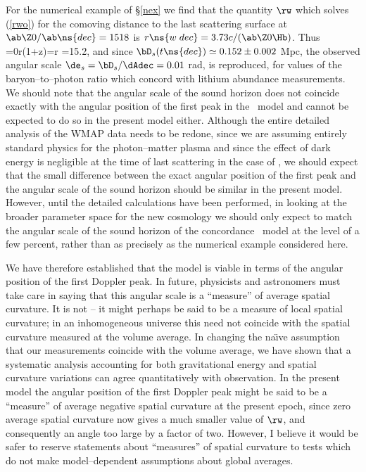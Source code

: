 \documentclass[12pt]{iopart}
\begin{document}
For the numerical example
of \S\ref{nex} we find that the quantity $\rw$ which solves (\ref{rwo})
for the comoving distance to the
last scattering surface at $\ab\Z0/\ab\ns{dec}=1518$ is $r\ns{w\;dec}=3.73
c/(\ab\Z0\Hb)$.
Thus
\beq
\dAdec={\ab\Z0r\over\gc(1+z)}=\ab{}r
=15.2,
\label{dAs}\eeq
and since $\bD_s(t\ns{dec})\simeq0.152\pm0.002$ Mpc, the observed angular
scale $\de_s=\bD_s/\dAdec=0.01$ rad, is reproduced, for values of the
baryon--to--photon ratio which concord with lithium abundance measurements.
We should note that the angular scale of the sound horizon does not coincide
exactly with the angular position of the first peak in the \LCDM\ model and
cannot be expected to do so in the present model either. Although the entire
detailed analysis of the
WMAP data needs to be redone, since we are assuming entirely standard physics
for the photon--matter plasma and since the effect of dark energy is
negligible at the time of last scattering in the case of \LCDM, we should
expect that the small difference between the exact angular position of the
first peak and the angular scale of the sound horizon should be similar in
the present model. However, until the detailed calculations have been
performed, in looking at the broader parameter space for the new cosmology
we should only expect to match the angular scale of the
sound horizon of the concordance \LCDM\ model at the level of a few percent,
rather than as precisely as the numerical example considered here.

We have therefore established that the model is viable in terms of the
angular position of the first Doppler peak. In future, physicists and
astronomers must take care in saying that this angular scale is a
``measure'' of average spatial curvature. It is not -- it might perhaps
be said to be a measure of
local spatial curvature; in an inhomogeneous universe this need not
coincide with the spatial curvature measured at the volume average.
In changing the na\"{\i}ve assumption that our measurements coincide
with the volume average, we have shown that a systematic analysis
accounting for both gravitational energy and spatial curvature variations
can agree quantitatively with observation.
In the present model the angular position of the
first Doppler peak might be said to be a ``measure'' of
average negative spatial curvature at the present epoch, since zero average
spatial curvature now gives a much smaller value of $\rw$, and
consequently an angle too large by a factor of two. However,
I believe it would be safer to reserve statements about ``measures''
of spatial curvature to tests \cite{elliptic2,elliptic1}
which do not make model--dependent assumptions about global averages.
\end{document}
